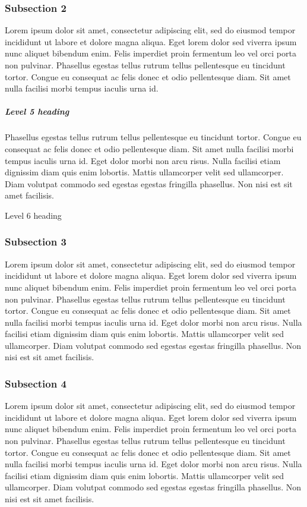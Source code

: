 \documentclass[
]{article}
\begin{document}
\subsubsection{Subsection 2}\label{subsection-2}

Lorem ipsum dolor sit amet, consectetur adipiscing elit, sed do eiusmod
tempor incididunt ut labore et dolore magna aliqua. Eget lorem dolor sed
viverra ipsum nunc aliquet bibendum enim. Felis imperdiet proin
fermentum leo vel orci porta non pulvinar. Phasellus egestas tellus
rutrum tellus pellentesque eu tincidunt tortor. Congue eu consequat ac
felis donec et odio pellentesque diam. Sit amet nulla facilisi morbi
tempus iaculis urna id.

\subparagraph{Level 5 heading}\label{level-5-heading}

Phasellus egestas tellus rutrum tellus pellentesque eu tincidunt tortor.
Congue eu consequat ac felis donec et odio pellentesque diam. Sit amet
nulla facilisi morbi tempus iaculis urna id. Eget dolor morbi non arcu
risus. Nulla facilisi etiam dignissim diam quis enim lobortis. Mattis
ullamcorper velit sed ullamcorper. Diam volutpat commodo sed egestas
egestas fringilla phasellus. Non nisi est sit amet facilisis.

Level 6 heading

\subsubsection{Subsection 3}\label{subsection-3}

Lorem ipsum dolor sit amet, consectetur adipiscing elit, sed do eiusmod
tempor incididunt ut labore et dolore magna aliqua. Eget lorem dolor sed
viverra ipsum nunc aliquet bibendum enim. Felis imperdiet proin
fermentum leo vel orci porta non pulvinar. Phasellus egestas tellus
rutrum tellus pellentesque eu tincidunt tortor. Congue eu consequat ac
felis donec et odio pellentesque diam. Sit amet nulla facilisi morbi
tempus iaculis urna id. Eget dolor morbi non arcu risus. Nulla facilisi
etiam dignissim diam quis enim lobortis. Mattis ullamcorper velit sed
ullamcorper. Diam volutpat commodo sed egestas egestas fringilla
phasellus. Non nisi est sit amet facilisis.

\subsubsection{Subsection 4}\label{subsection-4}

Lorem ipsum dolor sit amet, consectetur adipiscing elit, sed do eiusmod
tempor incididunt ut labore et dolore magna aliqua. Eget lorem dolor sed
viverra ipsum nunc aliquet bibendum enim. Felis imperdiet proin
fermentum leo vel orci porta non pulvinar. Phasellus egestas tellus
rutrum tellus pellentesque eu tincidunt tortor. Congue eu consequat ac
felis donec et odio pellentesque diam. Sit amet nulla facilisi morbi
tempus iaculis urna id. Eget dolor morbi non arcu risus. Nulla facilisi
etiam dignissim diam quis enim lobortis. Mattis ullamcorper velit sed
ullamcorper. Diam volutpat commodo sed egestas egestas fringilla
phasellus. Non nisi est sit amet facilisis.
\end{document}
